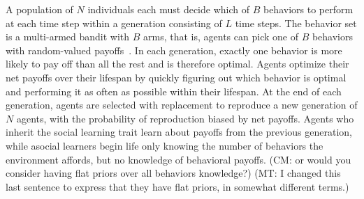 \documentclass[letterpaper,11.5pt]{scrartcl}
\newcommand{\mt}[1]{{\textcolor{myorange} {({\tiny MT:} #1)}}}
\newcommand{\cm}[1]{{\textcolor{mypurple} {({\tiny CM:} #1)}}}
\newcommand{\ps}[1]{{\textcolor{mygreen} {({\tiny PS:} #1)}}}
\begin{document}
A population of $N$ individuals each must decide which of $B$ behaviors to perform at
each time step within a generation consisting of $L$ time steps. The behavior set is a multi-armed bandit with $B$ arms, that is, agents can pick one of $B$ behaviors with random-valued payoffs~\cite{SuttonBartoBook,McElreath2005,Steyvers2009,Rendell2010,Schulz2019}.  
In each generation, exactly one behavior is more likely to pay off than all the rest and is therefore optimal. Agents
optimize their net payoffs over their lifespan by quickly figuring out which
behavior is optimal and performing it as often as possible within their lifespan.
At the end of each
generation, agents are selected with replacement to reproduce a new generation of $N$ agents,
with the probability of reproduction biased by net payoffs. Agents who inherit the social
learning trait learn about payoffs from the previous generation, while asocial learners begin
life only knowing the number of behaviors the environment affords, but no knowledge
of behavioral payoffs.
\cm{or would you consider having flat priors over all behaviors knowledge?} 
\mt{I changed this last sentence to express that they have flat priors, in somewhat different
terms.}

\end{document}
